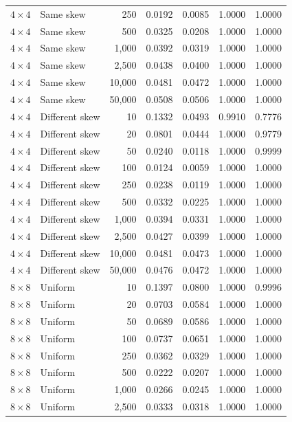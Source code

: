 \begin{longtable}{@{}llrrrrr@{}}
\(4\times4\) & Same skew & 250 & 0.0192 & 0.0085 & 1.0000 & 1.0000\\
\(4\times4\) & Same skew & 500 & 0.0325 & 0.0208 & 1.0000 & 1.0000\\
\(4\times4\) & Same skew & 1,000 & 0.0392 & 0.0319 & 1.0000 & 1.0000\\
\(4\times4\) & Same skew & 2,500 & 0.0438 & 0.0400 & 1.0000 & 1.0000\\
\(4\times4\) & Same skew & 10,000 & 0.0481 & 0.0472 & 1.0000 & 1.0000\\
\(4\times4\) & Same skew & 50,000 & 0.0508 & 0.0506 & 1.0000 & 1.0000\\
\(4\times4\) & Different skew & 10 & 0.1332 & 0.0493 & 0.9910 & 0.7776\\
\(4\times4\) & Different skew & 20 & 0.0801 & 0.0444 & 1.0000 & 0.9779\\
\(4\times4\) & Different skew & 50 & 0.0240 & 0.0118 & 1.0000 & 0.9999\\
\(4\times4\) & Different skew & 100 & 0.0124 & 0.0059 & 1.0000 & 1.0000\\
\(4\times4\) & Different skew & 250 & 0.0238 & 0.0119 & 1.0000 & 1.0000\\
\(4\times4\) & Different skew & 500 & 0.0332 & 0.0225 & 1.0000 & 1.0000\\
\(4\times4\) & Different skew & 1,000 & 0.0394 & 0.0331 & 1.0000 & 1.0000\\
\(4\times4\) & Different skew & 2,500 & 0.0427 & 0.0399 & 1.0000 & 1.0000\\
\(4\times4\) & Different skew & 10,000 & 0.0481 & 0.0473 & 1.0000 & 1.0000\\
\(4\times4\) & Different skew & 50,000 & 0.0476 & 0.0472 & 1.0000 & 1.0000\\
\midrule
\(8\times8\) & Uniform & 10 & 0.1397 & 0.0800 & 1.0000 & 0.9996\\
\(8\times8\) & Uniform & 20 & 0.0703 & 0.0584 & 1.0000 & 1.0000\\
\(8\times8\) & Uniform & 50 & 0.0689 & 0.0586 & 1.0000 & 1.0000\\
\(8\times8\) & Uniform & 100 & 0.0737 & 0.0651 & 1.0000 & 1.0000\\
\(8\times8\) & Uniform & 250 & 0.0362 & 0.0329 & 1.0000 & 1.0000\\
\(8\times8\) & Uniform & 500 & 0.0222 & 0.0207 & 1.0000 & 1.0000\\
\(8\times8\) & Uniform & 1,000 & 0.0266 & 0.0245 & 1.0000 & 1.0000\\
\(8\times8\) & Uniform & 2,500 & 0.0333 & 0.0318 & 1.0000 & 1.0000\\

\end{longtable}
